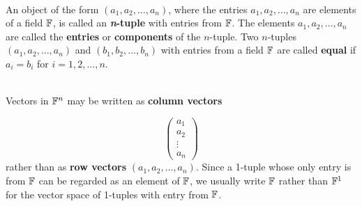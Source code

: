 \begin{definition}
	\hfill\\
	An object of the form $(a_1, a_2, \dots, a_n)$, where the entries $a_1, a_2, \dots, a_n$ are elements of a field $\mathbb{F}$, is called an \textbf{\textit{n}-tuple} with entries from $\mathbb{F}$. The elements $a_1, a_2, \dots, a_n$ are called the \textbf{entries} or \textbf{components} of the $n$-tuple. Two $n$-tuples $(a_1, a_2, \dots, a_n)$ and $(b_1, b_2, \dots, b_n)$ with entries from a field $\mathbb{F}$ are called \textbf{equal} if $a_i = b_i$ for $i=1, 2, \dots, n$.
\end{definition}

\begin{definition}
	\hfill\\
	Vectors in $\mathbb{F}^n$ may be written as \textbf{column vectors}
	
	\[\begin{pmatrix} a_1 \\ a_2 \\ \vdots \\ a_n \end{pmatrix}\]
	rather than as \textbf{row vectors} $(a_1, a_2, \dots, a_n)$. Since a 1-tuple whose only entry is from $\mathbb{F}$ can be regarded as an element of $\mathbb{F}$, we usually write $\mathbb{F}$ rather than $\mathbb{F}^1$ for the vector space of 1-tuples with entry from $\mathbb{F}$.
\end{definition}

